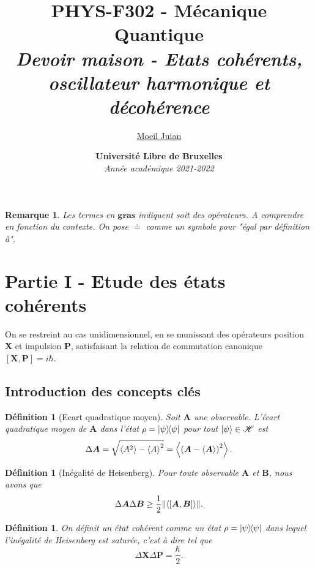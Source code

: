 \documentclass[11pt,oneside,a4paper]{article}
\title{%
  \textbf{PHYS-F302 - Mécanique Quantique} \\
  \textit{Devoir maison - Etats cohérents, oscillateur harmonique et décohérence}
}
\author{%
  \href{mailto:juian.moeil@ulb.be}{Moeil Juian}
}
\date{%
  \textbf{Université Libre de Bruxelles} \\
  \emph{Année académique 2021-2022}
}
\newcommand{\h}{\ensuremath{\hbar}}
\newtheorem{definition}[theorem]{Définition}
\newtheorem{remark}[theorem]{Remarque}
\begin{document}
\maketitle
\tableofcontents
\newpage

\begin{remark}
  Les termes en $\bm{gras}$ indiquent soit des opérateurs. A comprendre en fonction du contexte. On pose $\doteq$ comme un symbole pour "égal par définition à".
\end{remark}
\section{Partie I - Etude des états cohérents}
On se restreint au cas unidimensionnel, en se munissant des opérateurs position $\bm{X}$ et impulsion $\bm{P}$, satisfaisant la relation de commutation canonique $[\bm{X},\bm{P}] = i\h$.

\subsection*{Introduction des concepts clés}
\begin{definition}[Ecart quadratique moyen]
  Soit $\bm{A}$ une observable. L'écart quadratique moyen de $\bm{A}$ dans l'état $\rho = \ketbra{\psi}$ pour tout $\ket{\psi}\in\mathcal{H}$ est 
  \begin{equation}
    \Delta\bm{A} = \sqrt{\expval{A^2}-\expval{A}^2} = \expval{\left(\bm{A}-\expval{\bm{A}}\right)^2}.
  \end{equation}
\end{definition}

\begin{definition}[Inégalité de Heisenberg]
  Pour toute observable $\bm{A}$ et $\bm{B}$, nous avons que
  \begin{equation}
    \label{Heisenberg inequality}
    \Delta\bm{A}\Delta\bm{B}\geq\frac{1}{2}\norm{\expval{[\bm{A},\bm{B}]}}.
  \end{equation}
\end{definition}

\begin{definition}
  \label{def etat coherent saturation}
    On définit un état cohérent comme un état $\rho = \ketbra{\psi}$ dans lequel l'inégalité de Heisenberg est saturée, c'est à dire tel que
    \begin{equation}
      \Delta\bm{X}\Delta\bm{P} = \frac{\h}{2}.
    \end{equation} 
\end{definition}
\end{document}
